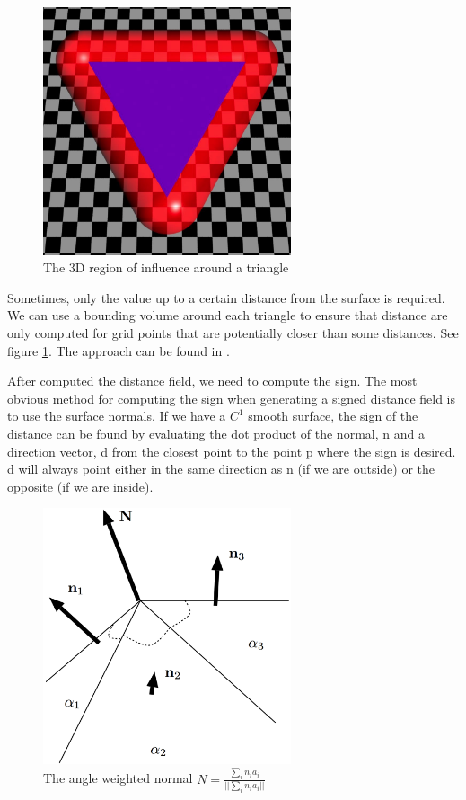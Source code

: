 \begin{figure}
\sidecaption
	\includegraphics[width=0.65\textwidth]{graphics/df/close-triangle}
	\caption{The 3D region of influence around a triangle}
	\label{f:close-triangle}
\end{figure}

Sometimes, only the value up to a certain distance from the surface is required. We can use a bounding volume around each triangle to ensure that distance are only computed for grid points that are potentially closer than some distances. See figure \ref{f:close-triangle}. The approach can be found in \cite[5.0mm]{a:Incremental-Triangle-Voxelization}.

After computed the distance field, we need to compute the sign. The most obvious method for computing the sign when generating a signed distance field is to use the surface normals. If we have a $C^{1}$ smooth surface, the sign of the distance can be found by evaluating the dot product of the normal, n and a direction vector, d from the closest point to the point p where the sign is desired. d will always point either in the same direction as n (if we are outside) or the opposite (if we are inside).

\begin{figure}
\sidecaption
	\includegraphics[width=0.65\textwidth]{graphics/df/Computing-vertex-normals}
	\caption{The angle weighted normal $N=\frac{\sum_{i}n_{i}a_{i}}{||\sum_{i}n_{i}a_{i}||}$}
	\label{f:weighted-normal}
\end{figure}


